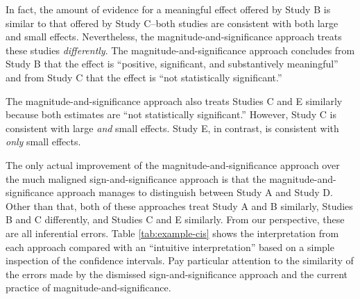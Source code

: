 \documentclass[12pt]{article}
\begin{document}
In fact, the amount of evidence for a meaningful effect offered by Study B is similar to that offered by Study C--both studies are consistent with both large and small effects. Nevertheless, the magnitude-and-significance approach treats these studies \emph{differently}. The magnitude-and-significance approach concludes from Study B that the effect is ``positive, significant, and substantively meaningful''  and from Study C that the effect is ``not statistically significant.''

The magnitude-and-significance approach also treats Studies C and E similarly because both estimates are ``not statistically significant.'' However, Study C is consistent with large \emph{and} small effects. Study E, in contrast, is consistent with \emph{only} small effects.

The only actual improvement of the magnitude-and-significance approach over the much maligned sign-and-significance approach is that the magnitude-and-significance approach manages to distinguish between Study A and Study D. Other than that, both of these approaches treat Study A and B similarly, Studies B and C differently, and Studies C and E similarly. From our perspective, these are all inferential errors. Table \ref{tab:example-cis} shows the interpretation from each approach compared with an ``intuitive interpretation'' based on a simple inspection of the confidence intervals. Pay particular attention to the similarity of the errors made by the dismissed sign-and-significance approach and the current practice of magnitude-and-significance.
\end{document}
